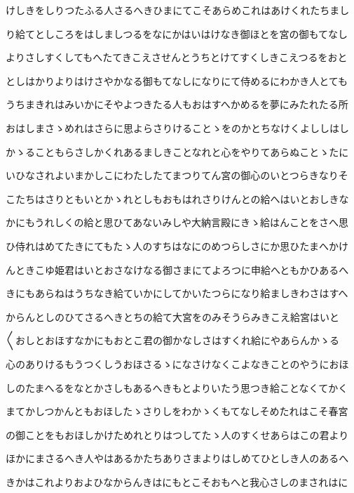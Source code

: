 \documentclass[a4paper,11pt,landscape]{ltjtarticle}
\begin{document}
\par\medskip
けしきをしりつたふる人さるへきひまにてこそあらめこれはあけくれたちまし
\par\medskip
り給てとしころをはしましつるをなにかはいはけなき御ほとを宮の御もてなし
\par\medskip
よりさしすくしてもへたてきこえさせんとうちとけてすくしきこえつるをおと
\par\medskip
としはかりよりはけさやかなる御もてなしになりにて侍めるにわかき人とても
\par\medskip
うちまきれはみいかにそやよつきたる人もおはすへかめるを夢にみたれたる所
\par\medskip
おはしまさゝめれはさらに思よらさりけることゝをのかとちなけくよししはし
\par\medskip
かゝることもらさしかくれあるましきことなれと心をやりてあらぬことゝたに
\par\medskip
いひなされよいまかしこにわたしたてまつりてん宮の御心のいとつらきなりそ
\par\medskip
こたちはさりともいとかゝれとしもおもはれさりけんとの給へはいとおしきな
\par\medskip
かにもうれしくの給と思ひてあないみしや大納言殿にきゝ給はんことをさへ思
\par\medskip
ひ侍れはめてたきにてもたゝ人のすちはなにのめつらしさにか思ひたまへかけ
\par\medskip
んときこゆ姫君はいとおさなけなる御さまにてよろつに申給へともかひあるへ
\par\medskip
きにもあらねはうちなき給ていかにしてかいたつらになり給ましきわさはすへ
\par\medskip
からんとしのひてさるへきとちの給て大宮をのみそうらみきこえ給宮はいと
\par\medskip
〱おしとおほすなかにもおとこ君の御かなしさはすくれ給にやあらんかゝる
\par\medskip
心のありけるもうつくしうおほさるゝになさけなくこよなきことのやうにおほ
\par\medskip
しのたまへるをなとかさしもあるへきもとよりいたう思つき給ことなくてかく
\par\medskip
まてかしつかんともおほしたゝさりしをわかゝくもてなしそめたれはこそ春宮
\par\medskip
の御ことをもおほしかけためれとりはつしてたゝ人のすくせあらはこの君より
\par\medskip
ほかにまさるへき人やはあるかたちありさまよりはしめてひとしき人のあるへ
\par\medskip
きかはこれよりおよひなからんきはにもとこそおもへと我心さしのまされはに
\end{document}
